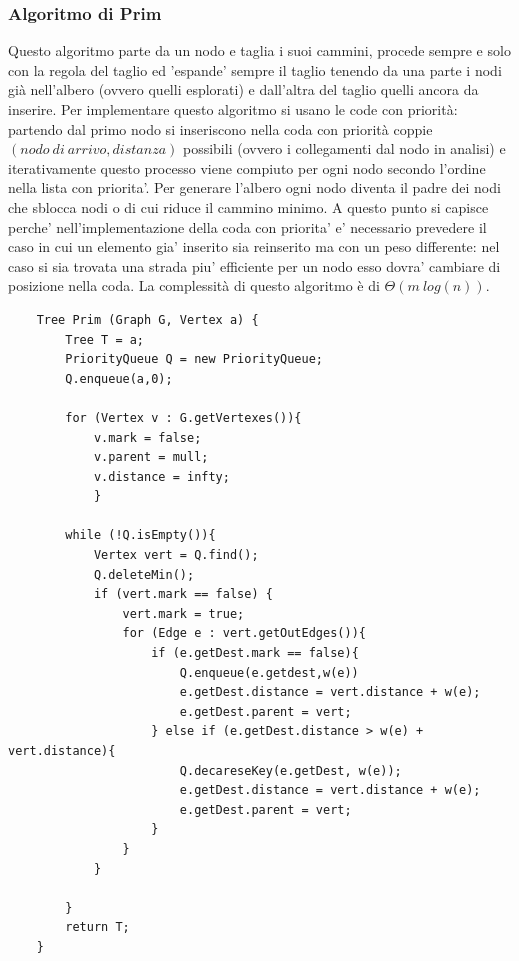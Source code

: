 \documentclass{article}
\begin{document}
\subsubsection{Algoritmo di Prim}
Questo algoritmo parte da un nodo e taglia i suoi cammini, procede sempre e solo con la regola del taglio ed 'espande' sempre il taglio tenendo da una parte i nodi già nell'albero (ovvero quelli esplorati) e dall'altra del taglio quelli ancora da inserire.
Per implementare questo algoritmo si usano le code con priorità: partendo dal primo nodo si inseriscono nella coda con priorità coppie $(nodo\ di\ arrivo, distanza)$ possibili (ovvero i collegamenti dal nodo in analisi) e iterativamente questo processo viene compiuto per ogni nodo secondo l'ordine nella lista con priorita'.
Per generare l'albero ogni nodo diventa il padre dei nodi che sblocca nodi o di cui riduce il cammino minimo.
A questo punto si capisce perche' nell'implementazione della coda con priorita' e' necessario prevedere il caso in cui un elemento gia' inserito sia reinserito ma con un peso differente: nel caso si sia trovata una strada piu' efficiente per un nodo esso dovra' cambiare di posizione nella coda. 
La complessità di questo algoritmo è di $\Theta(m\ log(n))$.

\begin{verbatim}
    Tree Prim (Graph G, Vertex a) {
        Tree T = a;
        PriorityQueue Q = new PriorityQueue;
        Q.enqueue(a,0);

        for (Vertex v : G.getVertexes()){
            v.mark = false;
            v.parent = mull;
            v.distance = infty;
            }
        
        while (!Q.isEmpty()){
            Vertex vert = Q.find();
            Q.deleteMin();
            if (vert.mark == false) {
                vert.mark = true;
                for (Edge e : vert.getOutEdges()){
                    if (e.getDest.mark == false){
                        Q.enqueue(e.getdest,w(e))
                        e.getDest.distance = vert.distance + w(e);
                        e.getDest.parent = vert;
                    } else if (e.getDest.distance > w(e) + vert.distance){
                        Q.decareseKey(e.getDest, w(e));
                        e.getDest.distance = vert.distance + w(e);
                        e.getDest.parent = vert;
                    }
                }
            }
    
        }
        return T;
    }
\end{verbatim}
\end{document}
